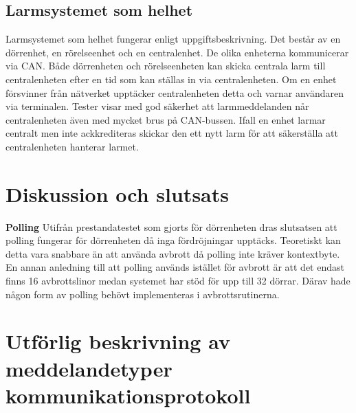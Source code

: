 \documentclass{article}
\begin{document}
 \subsection{Larmsystemet som helhet}
 Larmsystemet som helhet fungerar enligt uppgiftsbeskrivning. Det består av
 en dörrenhet, en rörelseenhet och en centralenhet. De olika enheterna kommunicerar via CAN. Både dörrenheten och rörelseenheten kan skicka centrala larm till centralenheten efter en tid som kan ställas in via centralenheten. Om en enhet försvinner från nätverket upptäcker centralenheten detta och varnar användaren via terminalen. Tester visar med god säkerhet att larmmeddelanden når centralenheten även med mycket brus på CAN-bussen.
 Ifall en enhet larmar centralt men inte ackkrediteras skickar den ett nytt larm för att säkerställa att centralenheten hanterar larmet.

\newpage
\section{Diskussion och slutsats}
\textbf{Polling} Utifrån prestandatestet som gjorts för dörrenheten dras slutsatsen att polling fungerar för dörrenheten då inga fördröjningar upptäcks. Teoretiskt kan detta vara snabbare än att använda avbrott då polling inte kräver kontextbyte. En annan anledning till
att polling används istället för avbrott är att det endast finns 16 avbrottslinor medan systemet har stöd för upp till 32 dörrar. Därav hade någon form av polling behövt implementeras i avbrottsrutinerna.






\appendix
    \section{Utförlig beskrivning av meddelandetyper kommunikationsprotokoll}
    \label{bilaga:protokoll}
        
\end{document}
